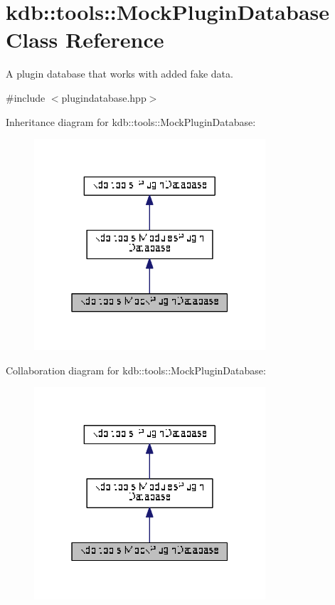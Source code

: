 \hypertarget{classkdb_1_1tools_1_1MockPluginDatabase}{\section{kdb\+:\+:tools\+:\+:Mock\+Plugin\+Database Class Reference}
\label{classkdb_1_1tools_1_1MockPluginDatabase}
}


A plugin database that works with added fake data.  




{\ttfamily \#include $<$plugindatabase.\+hpp$>$}



Inheritance diagram for kdb\+:\+:tools\+:\+:Mock\+Plugin\+Database\+:
\nopagebreak
\begin{figure}[H]
\begin{center}
\leavevmode
\includegraphics[width=244pt]{classkdb_1_1tools_1_1MockPluginDatabase__inherit__graph}
\end{center}
\end{figure}


Collaboration diagram for kdb\+:\+:tools\+:\+:Mock\+Plugin\+Database\+:
\nopagebreak
\begin{figure}[H]
\begin{center}
\leavevmode
\includegraphics[width=244pt]{classkdb_1_1tools_1_1MockPluginDatabase__coll__graph}
\end{center}
\end{figure}
